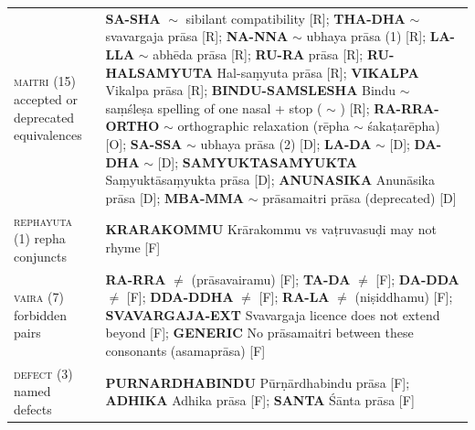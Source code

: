 {\begin{tabularx}{\textwidth}{@{}>{\raggedright\arraybackslash}p{2.6cm}Y@{}}
\textsc{maitri} (15) accepted or deprecated equivalences & \textbf{SA-SHA}  $\sim$  sibilant compatibility [R]; \textbf{THA-DHA}  $\sim$  svavargaja prāsa [R]; \textbf{NA-NNA}  $\sim$  ubhaya prāsa (1) [R]; \textbf{LA-LLA}  $\sim$  abhēda prāsa [R]; \textbf{RU-RA}  prāsa [R]; \textbf{RU-HALSAMYUTA} Hal-saṃyuta  prāsa [R]; \textbf{VIKALPA} Vikalpa prāsa [R]; \textbf{BINDU-SAMSLESHA} Bindu $\sim$ saṃśleṣa spelling of one nasal + stop ( $\sim$ ) [R]; \textbf{RA-RRA-ORTHO}  $\sim$  orthographic relaxation (rēpha $\sim$ śakaṭarēpha) [O]; \textbf{SA-SSA}  $\sim$  ubhaya prāsa (2) [D]; \textbf{LA-DA}  $\sim$  [D]; \textbf{DA-DHA}  $\sim$  [D]; \textbf{SAMYUKTASAMYUKTA} Saṃyuktāsaṃyukta prāsa [D]; \textbf{ANUNASIKA} Anunāsika prāsa [D]; \textbf{MBA-MMA}  $\sim$  prāsamaitri prāsa (deprecated) [D] \\
\textsc{rephayuta} (1) repha conjuncts & \textbf{KRARAKOMMU} Krārakommu vs vaṭruvasuḍi may not rhyme [F] \\
\textsc{vaira} (7) forbidden pairs & \textbf{RA-RRA}  $\neq$  (prāsavairamu) [F]; \textbf{TA-DA}  $\neq$  [F]; \textbf{DA-DDA}  $\neq$  [F]; \textbf{DDA-DDHA}  $\neq$  [F]; \textbf{RA-LA}  $\neq$  (niṣiddhamu) [F]; \textbf{SVAVARGAJA-EXT} Svavargaja licence does not extend beyond  [F]; \textbf{GENERIC} No prāsamaitri between these consonants (asamaprāsa) [F] \\
\textsc{defect} (3) named defects & \textbf{PURNARDHABINDU} Pūrṇārdhabindu prāsa [F]; \textbf{ADHIKA} Adhika prāsa [F]; \textbf{SANTA} Śānta prāsa [F] \\
\bottomrule
\end{tabularx}
\label{tab:prasarules}\par}
\medskip
